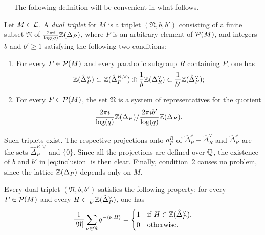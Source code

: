 \begin{paragr} --- \label{S:duaux} The following definition will be convenient in what follows.

\begin{definition}\label{def:nu} Let $M\in \mathcal{L}$. A \emph{dual triplet} for $M$ is a triplet $(\mathfrak{N},b,b')$ consisting of a finite subset $\mathfrak{N}$ of $\frac{2\pi i }{\log(q)}\mathbb{Z}(\Delta_P)$, where $P$ is an arbitrary element of $\mathcal{P}(M)$, and integers $b$ and $b'\geq 1$ satisfying the following two conditions:
  \begin{enumerate}
  \item For every $P\in \mathcal{P}(M)$ and every parabolic subgroup $R$ containing $P$, one has 
  \begin{equation}
    \label{eq:inclusion}
    \mathbb{Z}(\hat{\Delta}_P^{\vee})\subset \mathbb{Z}(\hat{\Delta}_P^{R,\vee})\oplus \frac{1}{b}\mathbb{Z}(\Delta_R^{\vee}) \subset \frac{1}{b'}\mathbb{Z}(\hat{\Delta}_P^{\vee});
  \end{equation}
\item For every $P\in \mathcal{P}(M)$, the set $\mathfrak{N}$ is a system of representatives for the quotient 
$$\frac{2\pi i }{\log(q)}\mathbb{Z}(\Delta_P)/ \frac{2\pi i b'}{\log(q)}\mathbb{Z}(\Delta_P).$$
  \end{enumerate}
\end{definition}

\begin{remarque}\label{rq:nu}
Such triplets exist. The respective projections onto $a_P^R$ of $\hat{\Delta}_P^{\vee}-\hat{\Delta}_R^{\vee}$ and $\hat{\Delta}_R^{\vee}$ are the sets $\hat{\Delta}_P^{R,\vee}$ and $\{0\}$. Since all the projections are \og defined over $\mathbb{Q}$\fg{}, the existence of $b$ and $b'$ in \eqref{eq:inclusion} is then clear. Finally, condition~2 causes no problem, since the lattice $\mathbb{Z}(\Delta_P)$ depends only on $M$.

Every dual triplet $(\mathfrak{N},b,b')$ satisfies the following property: for every $P\in \mathcal{P}(M)$ and every $H\in \frac{1}{b'}\mathbb{Z}(\hat{\Delta}_P^{\vee})$, one has
\begin{equation}
  \label{eq:orth-triplet}
  \frac{1}{|\mathfrak{N}|}\sum_{\nu\in \mathfrak{N}} q^{-\langle \nu, H \rangle}= \begin{cases} 1 & \text{if }   H \in \mathbb{Z}(\hat{\Delta}_P^{\vee}),  \\ 0 & \text{otherwise.} \end{cases}
\end{equation}
\end{remarque}

\end{paragr}

